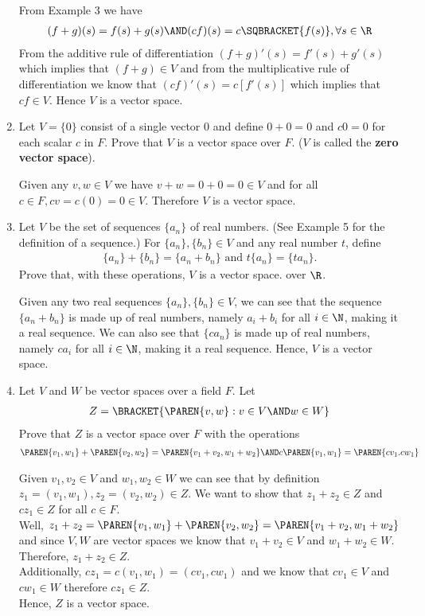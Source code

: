 \documentclass[10pt,a4paper]{report}
\begin{document}
\begin{enumerate}
	From Example 3 we have
	\begin{align*}
		(f+g)(s) = f(s)+g(s)\AND (cf)(s)= c\SQBRACKET{f(s)}, \forall s \in \R
	\end{align*}  From the additive rule of differentiation $(f+g)'(s) = f'(s)+g'(s)$ which implies that $(f+g) \in V$ and from the multiplicative rule of differentiation we know that $(cf)'(s)=c[f'(s)]$ which implies that $cf \in V$.  Hence $V$ is a vector space.
	
	\item Let $V=\{0\}$ consist of a single vector $0$ and define $0+0=0$ and $c0=0$ for each scalar $c$ in $F$.  Prove that $V$ is a vector space over $F$.  ($V$ is called the \textbf{zero vector space}).
	
	Given any $v,w \in V$ we have $v+w=0+0=0 \in V$ and for all $c\in F, cv=c(0)=0 \in V$.  Therefore $V$ is a vector space.
	\setcounter{enumi}{19}
	\item Let $V$ be the set of sequences $\{a_n\}$ of real numbers.  (See Example 5 for the definition of a sequence.)  For $\{a_n\},\{b_n\} \in V$ and any real number $t$, define
	\begin{align*}
		\{a_n\}+\{b_n\} = \{a_n+b _n\} \text{ and } t\{a_n\} = \{ta_n\}.
	\end{align*}Prove that, with these operations, $V$ is a vector space. over $\R$.
	
	Given any two real sequences $\{a_n\},\{b_n\} \in V$, we can see that the sequence $\{a_n + b_n\}$ is made up of real numbers, namely $a_i+b_i$ for all $i\in \N$, making it a real sequence.  We can also see that $\{c a_n\}$ is made up of real numbers, namely $ca_i$ for all $i \in \N$, making it a real sequence.  Hence, $V$ is a vector space.
	
	\item Let $V$ and $W$ be vector spaces over a field $F$.  Let 
	\begin{align*}
		Z = \BRACKET{\PAREN{v,w}: v \in V \AND w \in W}
	\end{align*}Prove that $Z$ is a vector space over $F$ with the operations
	\begin{align*}
	\PAREN{v_1, w_1}+\PAREN{v_2, w_2} = \PAREN{v_1+v_2, w_1+w_2} \AND c\PAREN{v_1, w_1}=\PAREN{cv_1.cw_1}
	\end{align*}
	
	Given $v_1, v_2 \in V$ and $w_1, w_2 \in W$ we can see that by definition $z_1=(v_1, w_1), z_2=(v_2, w_2) \in Z$.  We want to show that $z_1 + z_2 \in Z$ and $cz_1 \in Z$ for all $c \in F$.  \\
	Well, $z_1+z_2 = \PAREN{v_1, w_1}+\PAREN{v_2, w_2} = \PAREN{v_1+v_2, w_1+w_2}$ and since $V,W$ are vector spaces we know that $v_1+v_2\in V$ and $w_1+w_2 \in W$. Therefore, $z_1+z_2 \in Z$. \\
	Additionally, $cz_1 = c(v_1, w_1) = (cv_1, cw_1)$ and we know that $cv_1 \in V$ and $cw_1 \in W$ therefore $cz_1 \in Z$.\\
	Hence, $Z$ is a vector space.
\end{enumerate}
\newpage
\end{document}
